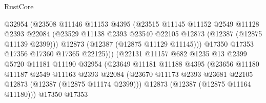 \begin{lexlean}{RustCore}
\begin{coremodule}
                                  @32954
                                  (@23508
                                    @11146
                                    @11153
                                    @4395
                                    (@23515
                                      @11145
                                      @11152
                                      @2549
                                      @11128
                                      @2393
                                      @22084
                                      (@23529
                                        @11138
                                        @2393
                                        @23540
                                        @22105
                                        @12873
                                        (@12387 (@12875 @11139 @2399)))
                                      @12873
                                      (@12387 (@12875 @11129 @11145)))
                                    @17350
                                    @17353
                                    @17356
                                    @17360
                                    @17365
                                    @22125)))
                              (@22131
                                @11157
                                @682
                                @1235
                                @13
                                @2399
                                @5720
                                @11181
                                @11190
                                @32954
                                (@23649
                                  @11181
                                  @11188
                                  @4395
                                  (@23656
                                    @11180
                                    @11187
                                    @2549
                                    @11163
                                    @2393
                                    @22084
                                    (@23670
                                      @11173
                                      @2393
                                      @23681
                                      @22105
                                      @12873
                                      (@12387 (@12875 @11174 @2399)))
                                    @12873
                                    (@12387 (@12875 @11164 @11180)))
                                  @17350
                                  @17353

\end{coremodule}
\end{lexlean}
